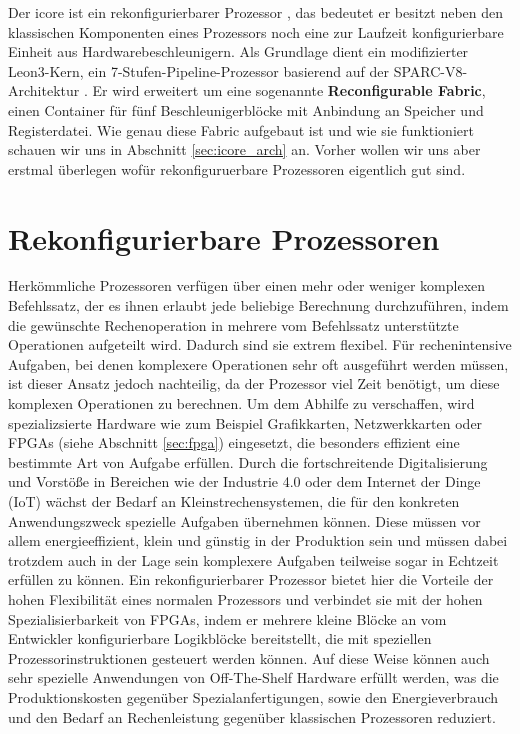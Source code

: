Der icore ist ein rekonfigurierbarer Prozessor , das bedeutet er besitzt neben den klassischen Komponenten
eines Prozessors noch eine zur Laufzeit konfigurierbare Einheit aus Hardwarebeschleunigern. 
Als Grundlage dient ein modifizierter Leon3-Kern, ein 7-Stufen-Pipeline-Prozessor basierend auf der SPARC-V8-Architektur .
Er wird erweitert um eine sogenannte \textbf{Reconfigurable Fabric}, einen Container für fünf Beschleunigerblöcke mit Anbindung an Speicher und Registerdatei.
Wie genau diese Fabric aufgebaut ist und wie sie funktioniert schauen wir uns in Abschnitt \ref{sec:icore_arch} an.
Vorher wollen wir uns aber erstmal überlegen wofür rekonfiguruerbare Prozessoren eigentlich gut sind.
\section{Rekonfigurierbare Prozessoren}
Herkömmliche Prozessoren verfügen über einen mehr oder weniger komplexen Befehlssatz, der es ihnen erlaubt jede beliebige Berechnung durchzuführen,
indem die gewünschte Rechenoperation in mehrere vom Befehlssatz unterstützte Operationen aufgeteilt wird. Dadurch sind sie extrem flexibel.
Für rechenintensive Aufgaben, bei denen komplexere Operationen sehr oft ausgeführt werden müssen, ist dieser Ansatz jedoch nachteilig,
da der Prozessor viel Zeit benötigt, um diese komplexen Operationen zu berechnen. Um dem Abhilfe zu verschaffen, wird spezializsierte Hardware
wie zum Beispiel Grafikkarten, Netzwerkkarten oder FPGAs (siehe Abschnitt \ref{sec:fpga}) eingesetzt, die besonders effizient eine bestimmte Art von Aufgabe erfüllen.
Durch die fortschreitende Digitalisierung und Vorstöße in Bereichen wie der Industrie 4.0 oder dem Internet der Dinge (IoT) wächst der Bedarf an Kleinstrechensystemen,
die für den konkreten Anwendungszweck spezielle Aufgaben übernehmen können. Diese müssen vor allem energieeffizient, klein und günstig in der Produktion sein
und müssen dabei trotzdem auch in der Lage sein komplexere Aufgaben teilweise sogar in Echtzeit erfüllen zu können.
Ein rekonfigurierbarer Prozessor bietet hier die Vorteile der hohen Flexibilität eines normalen Prozessors und verbindet sie mit der hohen Spezialisierbarkeit von FPGAs,
indem er mehrere kleine Blöcke an vom Entwickler konfigurierbare Logikblöcke bereitstellt, die mit speziellen Prozessorinstruktionen gesteuert werden können.
Auf diese Weise können auch sehr spezielle Anwendungen von Off-The-Shelf Hardware erfüllt werden, was die Produktionskosten gegenüber Spezialanfertigungen,
sowie den Energieverbrauch und den Bedarf an Rechenleistung gegenüber klassischen Prozessoren reduziert.

